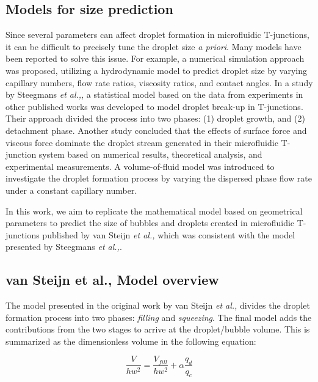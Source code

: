 \subsection{Models for size prediction}

Since several parameters can affect droplet formation in microfluidic T-junctions, it
can be difficult to precisely tune the droplet size \emph{a priori}. Many models
have been reported to solve this issue. For example, a numerical simulation approach was proposed, utilizing a
hydrodynamic model to predict droplet size by varying capillary numbers,
flow rate ratios, viscosity ratios, and contact angles\supercite{liu_droplet_2009}.
In a study by Steegmans \emph{et al.,}, a statistical model based on the data from
experiments in other published works was developed to model droplet break-up in T-junctions. Their approach divided
the process into two phases: (1) droplet growth, and (2) detachment phase\supercite{steegmans_generalised_2009}.
Another study concluded that the effects of surface force and viscous force dominate
the droplet stream generated in their microfluidic T-junction system based on numerical
results, theoretical analysis, and experimental measurements\supercite{li_study_2012}.
A volume-of-fluid model was introduced to investigate the droplet formation process
by varying the dispersed phase flow rate under a constant capillary
number\supercite{soh_numerical_2016}. 

In this work, we aim to replicate the mathematical model based on
geometrical parameters to predict the size of bubbles and droplets created in
microfluidic T-junctions published by van Steijn \emph{et al.,}\supercite{van_steijn_predictive_2010}
which was consistent with the model presented by Steegmans \emph{et al.,}.

\subsection{van Steijn et al., Model overview}

The model presented in the original work by van Steijn \emph{et al.,}
divides the droplet formation process into two phases: \emph{filling} and \emph{squeezing}. The final model
adds the contributions from the two stages to arrive at the droplet/bubble volume.
This is summarized as the dimensionless volume in the following equation:

\begin{equation}
  \frac{V}{hw^2} = \frac{V_{fill}}{hw^{2}}+\alpha\frac{q_{d}}{q_{c}}
\end{equation}

